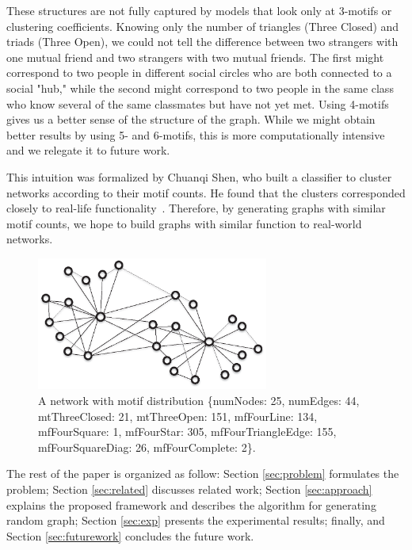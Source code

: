 These structures are not fully captured by models that look only at
3-motifs or clustering coefficients.  Knowing only the number of triangles
(Three Closed) and triads (Three Open), we could not tell the difference
between two strangers with one mutual friend and two strangers with two
mutual friends.  The first might correspond to two people in different
social circles who are both connected to a social "hub," while the
second might correspond to two people in the same class who know
several of the same classmates but have not yet met.  Using 4-motifs gives
us a better sense of the structure of the graph.  While
we might obtain better results by using 5- and 6-motifs, this is more
computationally intensive and we relegate it to future work.

This intuition was formalized by Chuanqi Shen, who built a classifier to
cluster networks according to their motif counts.  He found that the
clusters corresponded closely to real-life functionality~\cite{chuanqi}.
Therefore, by generating graphs with similar motif counts, we hope to build 
graphs with similar function to real-world networks.

\begin{figure}[t]
\centering
\includegraphics[width=3in]{Figures/network.eps}
\caption{A network with motif distribution \{numNodes: 25, numEdges: 44,
mtThreeClosed: 21, mtThreeOpen: 151, mfFourLine: 134,
mfFourSquare: 1, mfFourStar: 305, mfFourTriangleEdge: 155,
mfFourSquareDiag: 26, mfFourComplete: 2\}.}
\label{fig:network}
\end{figure}


The rest of the paper is organized as follow: Section \ref{sec:problem} formulates the problem; Section \ref{sec:related} discusses related work; Section \ref{sec:approach} explains the proposed framework and describes the algorithm for generating random graph; Section \ref{sec:exp} presents the experimental results; finally,  and Section \ref{sec:futurework} concludes the future work.


